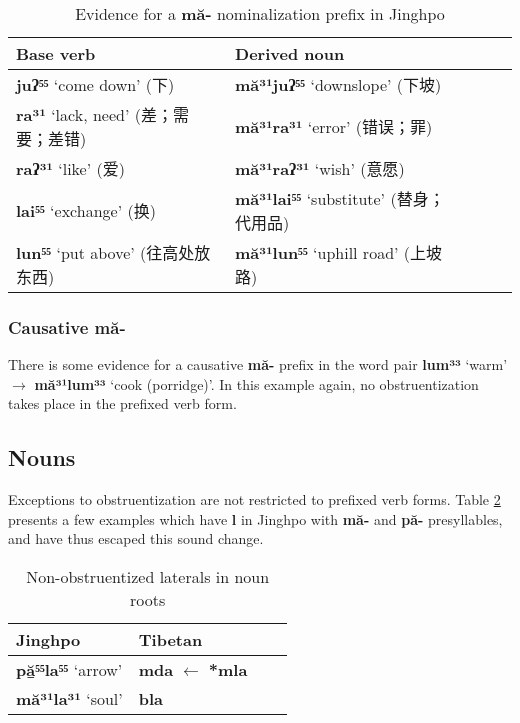 \documentclass[oneside,a4paper,11pt]{article}
\newcommand{\ipa}[1]{{\phon\textbf{#1}}}
\newcommand{\zh}[1]{{\cn #1}}
\begin{document}
\begin{table}[H]
\caption{Evidence for a \ipa{mă-} nominalization prefix in Jinghpo} \centering \label{tab:ma.nmlz}
\begin{tabular}{lllll}
\toprule
Base verb & Derived noun \\
\midrule
\ipa{juʔ⁵⁵} `come down' (\zh{下}) & \ipa{mă³¹juʔ⁵⁵} `downslope' (\zh{下坡}) \\
\ipa{ra³¹} `lack, need' (\zh{差；需要；差错}) &\ipa{mă³¹ra³¹} `error' (\zh{错误；罪}) \\
\ipa{raʔ³¹} `like' (\zh{爱}) &\ipa{mă³¹raʔ³¹} `wish' (\zh{意愿}) \\
\midrule
\ipa{lai⁵⁵} `exchange' (\zh{换}) &\ipa{mă³¹lai⁵⁵} `substitute' (\zh{替身；代用品}) \\
\ipa{lun⁵⁵} `put above' (\zh{往高处放东西}) &\ipa{mă³¹lun⁵⁵} `uphill road' (\zh{上坡路}) \\
\bottomrule
\end{tabular}
\end{table}




\subsubsection{Causative \ipa{mă-}}
There is some evidence for a causative \ipa{mă-} prefix in the word pair \ipa{lum³³} `warm' $\rightarrow$ \ipa{mă³¹lum³³} `cook (porridge)'. In this example again, no obstruentization takes place in the prefixed verb form.

\subsection{Nouns}
Exceptions to obstruentization are not restricted to prefixed verb forms. Table \ref{tab:pala} presents a few examples which have \ipa{l} in Jinghpo with \ipa{mă-} and \ipa{pă-} presyllables, and have thus escaped this sound change.

\begin{table}[H]
\caption{Non-obstruentized laterals in noun roots} \label{tab:pala} \centering
\begin{tabular}{llll}
\toprule
Jinghpo & Tibetan   \\
\midrule
\ipa{pă̱⁵⁵la⁵⁵} `arrow' &\ipa{mda} $\leftarrow$ \ipa{*mla}   \\
\ipa{mă³¹la³¹} `soul' &\ipa{bla}  \\
\bottomrule
\end{tabular}
\end{table}
\end{document}
